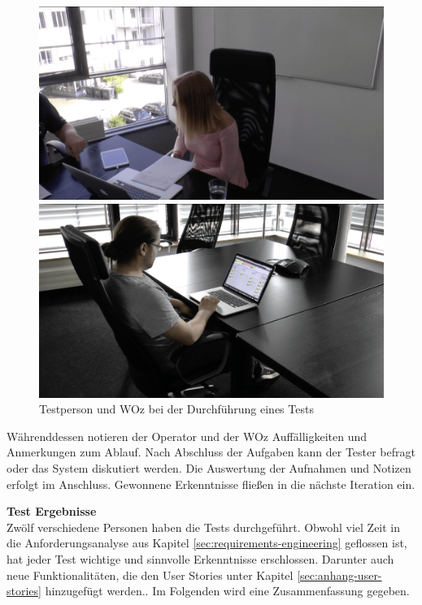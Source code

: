 \begin{figure}[!htb]
  \centering
  \begin{minipage}[b]{0.48\textwidth}
    \includegraphics[width=\textwidth]{bilder/3_testUser.png}
  \end{minipage}
  \begin{minipage}[b]{0.48\textwidth}
    \includegraphics[width=\textwidth]{bilder/3_testWoz.png}
  \end{minipage}
  \caption{Testperson und WOz bei der Durchführung eines Tests}
  \label{fig:test-user-woz}
\end{figure}

Währenddessen notieren der Operator und \ggf der \ac{WOz} Auffälligkeiten und Anmerkungen zum Ablauf. Nach Abschluss der Aufgaben kann der Tester befragt oder das System diskutiert werden. Die Auswertung der Aufnahmen und Notizen erfolgt im Anschluss. Gewonnene Erkenntnisse fließen in die nächste Iteration ein.

\textbf{Test Ergebnisse}\\
Zwölf verschiedene Personen haben die Tests durchgeführt. Obwohl viel Zeit in die Anforderungsanalyse aus Kapitel \ref{sec:requirements-engineering} geflossen ist, hat jeder Test wichtige und sinnvolle Erkenntnisse erschlossen. Darunter auch neue Funktionalitäten, die den User Stories unter Kapitel \ref{sec:anhang-user-stories} hinzugefügt werden.. Im Folgenden wird eine Zusammenfassung gegeben.

